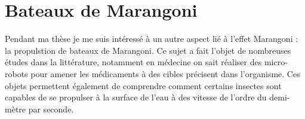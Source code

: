 \documentclass[french, 10pt]{article}
\begin{document}
% 
% 
% 

% 
\section{Bateaux de Marangoni}


Pendant ma thèse je me suis intéressé à un autre aspect lié à l'effet Marangoni : la propulstion de bateaux de Marangoni. Ce sujet a fait l'objet de nombreuses études dans la littérature, notamment en médecine on sait réaliser des micro-robots pour amener les médicaments à des cibles précisent dans l'organisme. Ces objets permettent également de comprendre comment certains insectes sont capables de se propulser à la surface de l'eau à des vitesse de l'ordre du demi-mètre par seconde. 
\end{document}
